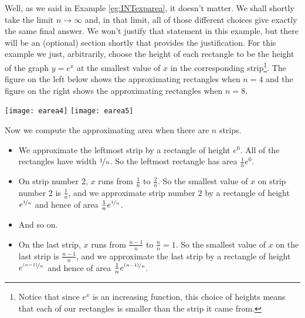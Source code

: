 \begin{eg}
Well, as we said in Example \ref{eg:INTexparea}, it doesn't matter. We shall
shortly take the limit $n\rightarrow\infty$ and, in that limit, all of those
different choices give exactly the same final answer. We won't justify that
statement in this example, but there will be an (optional) section shortly that
provides the justification. For this example we just, arbitrarily, choose the
height of each rectangle to be the height of the graph $y=e^x$ at the smallest
value of $x$ in the corresponding strip\footnote{Notice that since $e^x$ is an
increasing function, this choice of heights means that each of our rectangles is
smaller than the strip it came from.}. The figure on the left below shows the
approximating rectangles when $n=4$ and the figure on the right shows the
approximating rectangles when $n=8$.
\begin{efig}
\begin{center}
  \texttt{[image: earea4]}\qquad
  \texttt{[image: earea5]}
\end{center}
\end{efig}

Now we compute the approximating area when there are $n$ strips.
\begin{itemize}
\item We approximate the leftmost strip by a rectangle of height $e^0$. All of
the rectangles have width $\nicefrac{1}{n}$. So the leftmost rectangle has area
$\frac{1}{n}e^0$.

\item On strip number $2$, $x$ runs from $\frac{1}{n}$ to $\frac{2}{n}$. So the
smallest value of $x$ on strip number $2$ is $\frac{1}{n}$, and we approximate
strip number $2$ by a rectangle of height $e^{\nicefrac{1}{n}}$ and hence of
area $\frac{1}{n}e^{\nicefrac{1}{n}} $.

\item And so on.

\item On the last strip, $x$ runs from $\frac{n-1}{n}$ to $\frac{n}{n}=1$.
So the smallest value of $x$ on the last strip is $\frac{n-1}{n}$, and we
approximate the last strip by a rectangle of height $e^{\nicefrac{(n-1)}{n}}$
and hence of area $ \frac{1}{n}e^{\nicefrac{(n-1)}{n}} $.
\end{itemize}


\end{eg}
